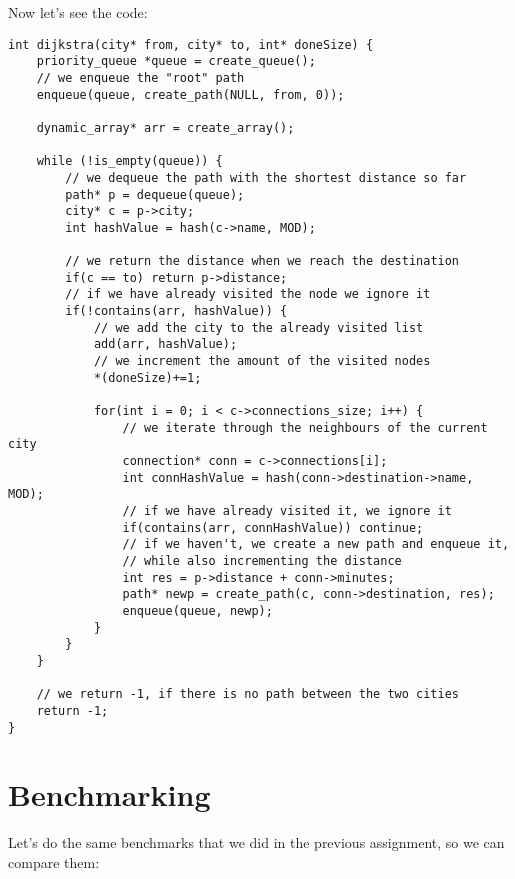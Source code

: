 \documentclass[a4paper,11pt]{article}
\begin{document}
    Now let's see the code:

    \begin{verbatim}
int dijkstra(city* from, city* to, int* doneSize) {
    priority_queue *queue = create_queue();
    // we enqueue the "root" path
    enqueue(queue, create_path(NULL, from, 0));

    dynamic_array* arr = create_array();

    while (!is_empty(queue)) {
        // we dequeue the path with the shortest distance so far
        path* p = dequeue(queue);
        city* c = p->city;
        int hashValue = hash(c->name, MOD);

        // we return the distance when we reach the destination
        if(c == to) return p->distance;
        // if we have already visited the node we ignore it
        if(!contains(arr, hashValue)) {
            // we add the city to the already visited list
            add(arr, hashValue);
            // we increment the amount of the visited nodes
            *(doneSize)+=1;

            for(int i = 0; i < c->connections_size; i++) {
                // we iterate through the neighbours of the current city
                connection* conn = c->connections[i];
                int connHashValue = hash(conn->destination->name, MOD);
                // if we have already visited it, we ignore it
                if(contains(arr, connHashValue)) continue;
                // if we haven't, we create a new path and enqueue it,
                // while also incrementing the distance
                int res = p->distance + conn->minutes;
                path* newp = create_path(c, conn->destination, res);
                enqueue(queue, newp);
            }
        }
    }

    // we return -1, if there is no path between the two cities
    return -1;
}
    \end{verbatim}

    \section*{Benchmarking}

    Let's do the same benchmarks that we did in the previous assignment, so we can compare them:
\end{document}
